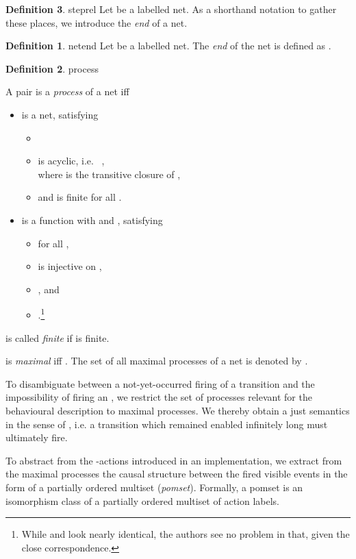 \documentclass[submission,copyright,creativecommons]{eptcs}
\theoremstyle{definition}
\newtheorem{definition}{Definition}
\def\defitem#1{\emph{#1}}
\def\ie{i.e.\ }
\begin{document}
\begin{definition}{steprel}{
  Let  be a labelled net.
  }
As a shorthand notation to gather these places, we introduce the \defitem{end}
of a net.

\begin{definition}{netend}{
  Let  be a labelled net.
  }
  The \defitem{end} of the net is defined as
  .
\end{definition}

\begin{definition}{process}{}
 \vspace{-3ex}
 \item[]
  A pair  is a
  \defitem{process} of a net 
  iff
  \begin{itemize}\itemsep 3pt
   \item  is a net, satisfying
   \begin{itemize}
    \item 
    \item  is acyclic, \ie
      ,\\
      where  is the transitive closure of ,
    \item and  is finite for all .
   \end{itemize}
    \item  is a function with 
     and , satisfying
   \begin{itemize}
\item  for all ,
    \item  is injective on ,
    \item , and
    \item .\footnote{While  and  look nearly identical, the authors see no problem in that, given the close correspondence.}
  \end{itemize}
  \end{itemize}
   is called \defitem{finite} if  is finite.

   is \defitem{maximal} iff .
  The set of all maximal processes of a net  is denoted by .
\end{definition}

\noindent
To disambiguate between a not-yet-occurred firing of a transition  and
the impossibility of firing an , we restrict the set of processes relevant
for the behavioural description to maximal processes. We thereby obtain
a just semantics in the sense of \cite{reisig84partialorder}, i.e. a transition
which remained enabled infinitely long must ultimately fire.

To abstract from the -actions introduced in an implementation, we
extract from the maximal processes the causal structure between the fired
visible events in the form of a partially ordered multiset (\defitem{pomset}).
Formally, a pomset is an isomorphism class of a partially ordered multiset of action labels.


\end{definition}
\end{document}
